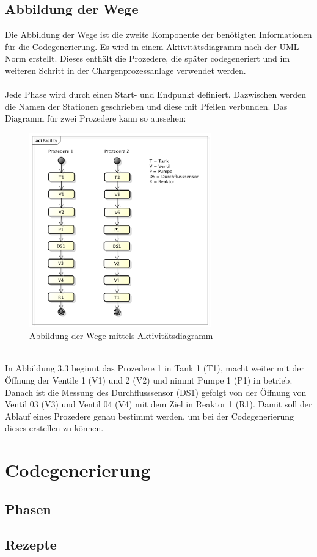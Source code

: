 

\subsection{Abbildung der Wege}
Die Abbildung der Wege ist die zweite Komponente der benötigten Informationen für die Codegenerierung. Es wird in einem Aktivitätsdiagramm nach der UML Norm erstellt. Dieses enthält die Prozedere, die später codegeneriert und im weiteren Schritt in der Chargenprozessanlage verwendet werden. \\\\
Jede Phase wird durch einen Start- und Endpunkt definiert. Dazwischen werden die Namen der Stationen geschrieben und diese mit Pfeilen verbunden. Das Diagramm für zwei Prozedere kann so aussehen: 
\begin{figure}[h!]
		\centering
		\includegraphics[width=0.7\textwidth]{graphics/konzept/UML_Activity.png}
		\caption{Abbildung der Wege mittels Aktivitätsdiagramm}
\end{figure}\\
In Abbildung 3.3 beginnt das Prozedere 1 in Tank 1 (T1), macht weiter mit der Öffnung der Ventile 1 (V1) und 2 (V2) und nimmt Pumpe 1 (P1) in betrieb. Danach ist die Messung des Durchflusssensor (DS1) gefolgt von der Öffnung von Ventil 03 (V3) und Ventil 04 (V4) mit dem Ziel in Reaktor 1 (R1). 
Damit soll der Ablauf eines Prozedere genau bestimmt werden, um bei der Codegenerierung dieses erstellen zu können.
\section{Codegenerierung}
\subsection{Phasen}
\subsection{Rezepte}

